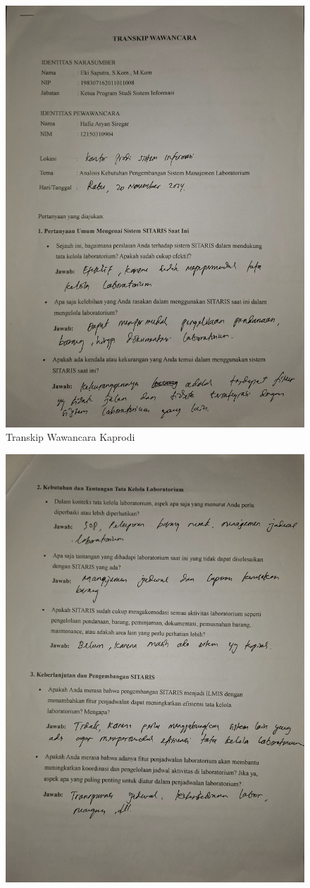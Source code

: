 \begin{figure}[h]
	\centering
	\includegraphics[width=0.82\linewidth]{konten/gambar/wawancara/1.jpg}
	\caption{Transkip Wawancara Kaprodi}
	\label{fig:hasil-wawancara}
\end{figure}
\begin{figure}[h]
	\centering
	\includegraphics[width=0.82\linewidth]{konten/gambar/wawancara/2.jpg}

	\label{fig:hasil-wawancara}
\end{figure}
